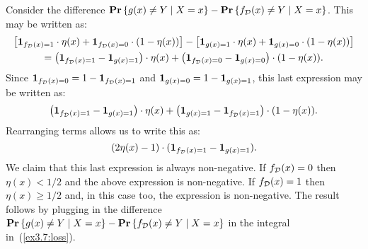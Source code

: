 Consider the difference $\mathbf{Pr} \left \{ g(x) \neq Y \mid X = x \right \} - \mathbf{Pr} \left \{ f_{\mathcal{D}}(x) \neq Y \mid X = x \right \}$.
This may be written as:
\begin{multline*}
\left [ \mathbf{1}_{f_{\mathcal{D}} (x) = 1} \cdot \eta (x)  +
        \mathbf{1}_{f_{\mathcal{D}} (x) = 0} \cdot (1 - \eta (x)) \right ] -
\left [ \mathbf{1}_{g(x) = 1} \cdot \eta (x)  +
        \mathbf{1}_{g(x) = 0} \cdot (1 - \eta (x)) \right ]  \\
  = \left ( \mathbf{1}_{f_{\mathcal{D}} (x) = 1} - \mathbf{1}_{g(x) = 1} \right ) \cdot \eta(x) +
  \left ( \mathbf{1}_{f_{\mathcal{D}} (x) = 0} - \mathbf{1}_{g(x) = 0} \right ) \cdot (1 - \eta(x)).
\end{multline*}
Since $\mathbf{1}_{f_{\mathcal{D}} (x) = 0} = 1 - \mathbf{1}_{f_{\mathcal{D}} (x) = 1}$ and
$\mathbf{1}_{g (x) = 0} = 1 - \mathbf{1}_{g(x) = 1}$, this last expression may be written as:
\[\left ( \mathbf{1}_{f_{\mathcal{D}} (x) = 1} - \mathbf{1}_{g(x) = 1} \right ) \cdot \eta(x) +
  \left ( \mathbf{1}_{g (x) = 1} - \mathbf{1}_{f_{\mathcal{D}} (x) = 1} \right ) \cdot (1 - \eta(x)).
\]
Rearranging terms allows us to write this as:
\begin{equation}
 (2 \eta (x) - 1) \cdot (\mathbf{1}_{f_{\mathcal{D}} (x) = 1} - \mathbf{1}_{g(x) = 1}).
\end{equation}
We claim that this last expression is always non-negative. If $f_{\mathcal{D}} (x) = 0$ then
$\eta (x) < 1/2$ and the above expression is non-negative. If $f_{\mathcal{D}} (x) = 1$ then
$\eta (x) \geq 1/2$ and, in this case too, the expression is non-negative. The result
follows by plugging in the difference
$\mathbf{Pr} \left \{ g(x) \neq Y \mid X = x \right \} - \mathbf{Pr} \left \{ f_{\mathcal{D}}(x) \neq Y \mid X = x \right \}$
in the integral in~(\ref{ex3.7:loss}).





